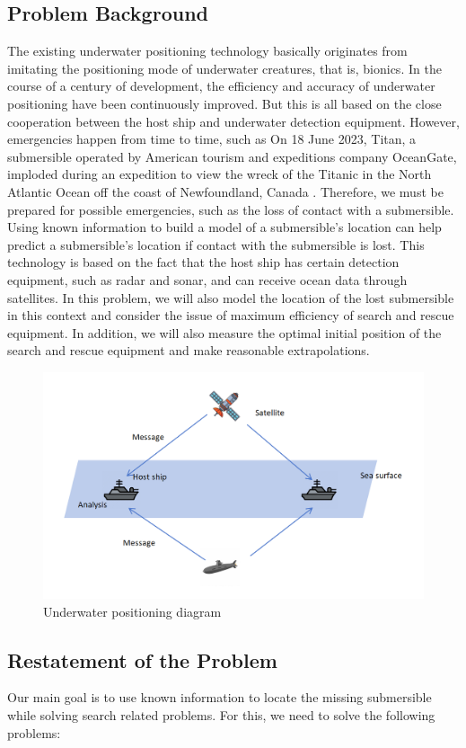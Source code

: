 \documentclass[12pt]{article}  %
\begin{document}
\subsection{Problem Background}
The existing underwater positioning technology basically originates from imitating the positioning mode of underwater creatures, that is, bionics. In the course of a century of development,
the efficiency and accuracy of underwater positioning have been continuously improved.
But this is all based on the close cooperation between the host ship and underwater detection equipment. However, emergencies happen from time to time, such as On 18 June 2023, Titan, a submersible operated by American tourism and expeditions company OceanGate, imploded during an expedition to view the wreck of the Titanic in the North Atlantic Ocean off the coast of Newfoundland, Canada . 
Therefore, we must be prepared for possible emergencies, such as the loss of contact with a submersible. Using known information to build a model of a submersible's location can help predict a submersible's location if contact with the submersible is lost. This technology is based on the fact that the host ship has certain detection equipment, such as radar and sonar, and can receive ocean data through satellites. In this problem, we will also model the location of the lost submersible in this context and consider the issue of maximum efficiency of search and rescue equipment.
In addition, we will also measure the optimal initial position of the search and rescue equipment and make reasonable extrapolations.
\begin{figure}[htbp]  %
\centering  %
\includegraphics[width=.7\textwidth]{background.png} %
\caption{Underwater positioning diagram} %

\end{figure}
\subsection{Restatement of the Problem}
Our main goal is to use known information to locate the missing submersible while solving search related problems.
For this, we need to solve the following problems:
\end{document}
